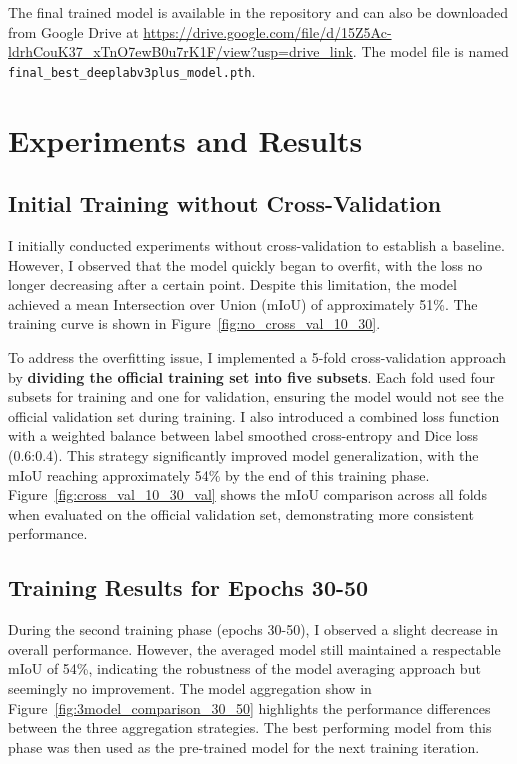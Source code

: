 \documentclass[]{article}
\begin{document}
The final trained model is available in the repository and can also be downloaded from Google Drive at \url{https://drive.google.com/file/d/15Z5Ac-ldrhCouK37_xTnO7ewB0u7rK1F/view?usp=drive_link}. The model file is named \texttt{final\_best\_deeplabv3plus\_model.pth}.

\section{Experiments and Results}\label{sec:Experiments}
\subsection{Initial Training without Cross-Validation}
I initially conducted experiments without cross-validation to establish a baseline. However, I observed that the model quickly began to overfit, with the loss no longer decreasing after a certain point. Despite this limitation, the model achieved a mean Intersection over Union (mIoU) of approximately 51\%. The training curve is shown in Figure~\ref{fig:no_cross_val_10_30}.

To address the overfitting issue, I implemented a 5-fold cross-validation approach by \textbf{dividing the official training set into five subsets}. Each fold used four subsets for training and one for validation, ensuring the model would not see the official validation set during training. I also introduced a combined loss function with a weighted balance between label smoothed cross-entropy and Dice loss (0.6:0.4). This strategy significantly improved model generalization, with the mIoU reaching approximately 54\% by the end of this training phase. Figure~\ref{fig:cross_val_10_30_val} shows the mIoU comparison across all folds when evaluated on the official validation set, demonstrating more consistent performance.

\subsection{Training Results for Epochs 30-50}
During the second training phase (epochs 30-50), I observed a slight decrease in overall performance. However, the averaged model still maintained a respectable mIoU of 54\%, indicating the robustness of the model averaging approach but seemingly no improvement. The model aggregation show in Figure~\ref{fig:3model_comparison_30_50} highlights the performance differences between the three aggregation strategies. The best performing model from this phase was then used as the pre-trained model for the next training iteration.
\end{document}
